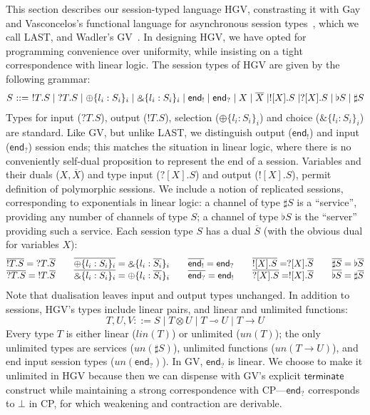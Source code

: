 \documentclass{easychair}
\makeatletter
\newcommand{\ba}{\begin{array}}
\newcommand{\ea}{\end{array}}
\newcommand{\bl}{\ba{@{}c@{}}}
\newcommand{\el}{\ea}
\newenvironment{equations}{\[\ba{@{}r@{~}c@{~}l@{}}}{\ea\]}
\newcommand{\key}{\mathsf}
\newcommand{\set}[1]{\{ #1 \}}
\newcommand{\row}[2]{\set{#1}_{#2}}
\newcommand{\gvOutput}[2]{\mathord{!}{#1}.{#2}}
\newcommand{\gvInput}[2]{\mathord{?}{#1}.{#2}}
\newcommand{\gvEndOutput}{\key{end}_!}
\newcommand{\gvEndInput}{\key{end}_?}
\newcommand{\gvPlus}[2]{\oplus \row{#1}{#2}}
\newcommand{\gvChoice}[2]{\binampersand \row{#1}{#2}}
\newcommand{\gvServer}[1]{\flat {#1}}
\newcommand{\gvService}[1]{\sharp {#1}}
\newcommand{\gvDual}[1]{\overline{#1}}
\newcommand{\gvOutputType}[2]{![{#1}].{#2}}
\newcommand{\gvInputType}[2]{?[{#1}].{#2}}
\newcommand{\la}{l}
\newcommand{\lolli}{\multimap}
\newcommand{\gvLinFun}[2]{{#1} \lolli {#2}}
\newcommand{\gvUnFun}[2]{{#1} \to {#2}}
\newcommand{\gvTimes}[2]{{#1} \otimes {#2}}
\newcommand{\cpBottom}{\bot}
\newcommand{\un}[1]{\mathit{un}(#1)}
\newcommand{\lin}[1]{\mathit{lin}(#1)}
\newcommand{\last}{LAST\xspace}
\newcommand{\hgv}{HGV\xspace}
\makeatother
\begin{document}
This section describes our session-typed language \hgv, constrasting it with Gay and Vasconcelos's
functional language for asynchronous session types~\cite{GayVasconcelos10}, which we call \last, and
Wadler's GV~\cite{Wadler12}.  In designing \hgv, we have opted for programming convenience over
uniformity, while insisting on a tight correspondence with linear logic.
%
The session types of \hgv are given by the following grammar:
\begin{equations}
  S & ::= & \gvOutput{T}{S} \mid \gvInput{T}{S} \mid
           \gvPlus{\la_i:S_i}{i} \mid \gvChoice{\la_i:S_i}{i} \mid
           \gvEndOutput \mid \gvEndInput
    \mid X \mid \gvDual{X} \mid
            \gvOutputType{X}{S} \mid \gvInputType{X}{S} \mid
            \gvServer{S} \mid \gvService{S}
\end{equations}%
Types for input ($\gvInput{T}{S}$), output ($\gvOutput{T}{S}$), selection ($\gvPlus{\la_i:S_i}{i}$)
and choice ($\gvChoice{\la_i:S_i}{i}$) are standard. Like GV, but unlike \last, we distinguish
output ($\gvEndOutput$) and input ($\gvEndInput$) session ends; this matches the situation in linear
logic, where there is no conveniently self-dual proposition to represent the end of a
session. Variables and their duals ($X,\gvDual{X}$) and type input ($\gvInputType{X}{S}$) and output
($\gvOutputType{X}{S}$), permit definition of polymorphic sessions. We include a notion of
replicated sessions, corresponding to exponentials in linear logic: a channel of type
$\gvService{S}$ is a ``service'', providing any number of channels of type $S$; a channel of type
$\gvServer{S}$ is the ``server'' providing such a service.
%
Each session type $S$ has a dual $\gvDual{S}$ (with the obvious dual for variables $X$):
\[
\bl
  \gvDual{\gvOutput{T}{S}} = \gvInput{T}{\gvDual{S}}
\qquad
  \gvDual{\gvPlus{\la_i:S_i}{i}} = \gvChoice{\la_i:\gvDual{S_i}}{i}
\qquad
  \gvDual{\gvEndOutput} = \gvEndInput
\qquad
  \gvDual{\gvOutputType{X}{S}} = \gvInputType{X}{\gvDual{S}}
\qquad
  \gvDual{\gvService{S}} = \gvServer{\gvDual{S}}
\\
  \gvDual{\gvInput{T}{S}} = \gvOutput{T}{\gvDual{S}}
\qquad
  \gvDual{\gvChoice{\la_i:S_i}{i}} = \gvPlus{\la_i:\gvDual{S_i}}{i}
\qquad
  \gvDual{\gvEndInput} = \gvEndOutput
\qquad
  \gvDual{\gvInputType{X}{S}} = \gvOutputType{X}{\gvDual{S}}
\qquad
  \gvDual{\gvServer{S}} = \gvService{\gvDual{S}}
\\
\el
\]
Note that dualisation leaves input and output types unchanged.  In addition to sessions, \hgv's
types include linear pairs, and linear and unlimited functions:
\[
T,U,V ::= S \mid \gvTimes{T}{U} \mid \gvLinFun{T}{U} \mid \gvUnFun{T}{U}
\]
%
Every type $T$ is either linear ($\lin{T}$) or unlimited ($\un{T}$); the only unlimited types are
services ($\un{\gvService{S}}$), unlimited functions ($\un{\gvUnFun{T}{U}}$), and end input session
types ($\un{\gvEndInput}$).
%
In GV, $\gvEndInput$ is linear. We choose to make it unlimited in \hgv because then we can dispense
with GV's explicit $\key{terminate}$ construct while maintaining a strong correspondence with
CP---$\gvEndInput$ corresponds to $\cpBottom$ in CP, for which weakening and contraction are
derivable.
\end{document}
